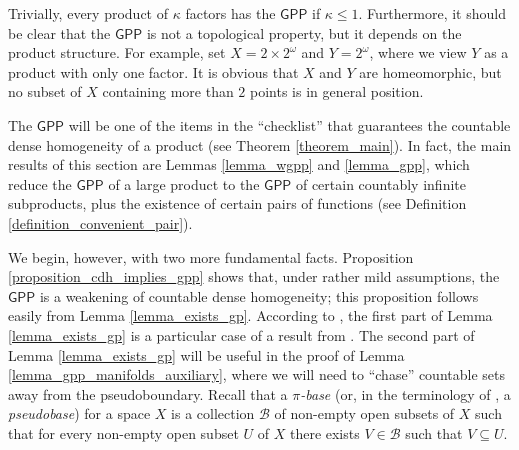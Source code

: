 \documentclass{amsart}
\theoremstyle{plain}
\theoremstyle{definition}
\newcommand{\GPP}{\mathsf{GPP}}
\newcommand{\BB}{\mathcal{B}}
\begin{document}
Trivially, every product of $\kappa$ factors has the $\GPP$ if $\kappa\leq 1$. Furthermore, it should be clear that the $\GPP$ is not a topological property, but it depends on the product structure. For example, set $X=2\times 2^\omega$ and $Y=2^\omega$, where we view $Y$ as a product with only one factor. It is obvious that $X$ and $Y$ are homeomorphic, but no subset of $X$ containing more than $2$ points is in general position.

The $\GPP$ will be one of the items in the ``checklist'' that guarantees the countable dense homogeneity of a product (see Theorem \ref{theorem_main}). In fact, the main results of this section are Lemmas \ref{lemma_wgpp} and \ref{lemma_gpp}, which reduce the $\GPP$ of a large product to the $\GPP$ of certain countably infinite subproducts, plus the existence of certain pairs of functions (see Definition \ref{definition_convenient_pair}).

We begin, however, with two more fundamental facts. Proposition \ref{proposition_cdh_implies_gpp} shows that, under rather mild assumptions, the $\GPP$ is a weakening of countable dense homogeneity; this proposition follows easily from Lemma \ref{lemma_exists_gp}. According to \cite{gruenhage_natkaniec_piotrowski}, the first part of Lemma \ref{lemma_exists_gp} is a particular case of a result from \cite{piotrowski}. The second part of Lemma \ref{lemma_exists_gp} will be useful in the proof of Lemma \ref{lemma_gpp_manifolds_auxiliary}, where we will need to ``chase'' countable sets away from the pseudoboundary. Recall that a \emph{$\pi$-base} (or, in the terminology of \cite{oxtoby}, a \emph{pseudobase}) for a space $X$ is a collection $\BB$ of non-empty open subsets of $X$ such that for every non-empty open subset $U$ of $X$ there exists $V\in\BB$ such that $V\subseteq U$.
\end{document}
